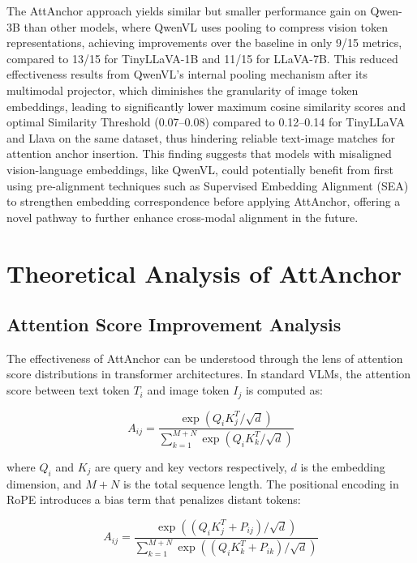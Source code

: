 \documentclass[11pt]{article}
\begin{document}
The AttAnchor approach yields similar but smaller performance gain on Qwen-3B than other models, where QwenVL uses pooling to compress vision token representations, achieving improvements over the baseline in only 9/15 metrics, compared to 13/15 for TinyLLaVA-1B and 11/15 for LLaVA-7B. This reduced effectiveness results from QwenVL's internal pooling mechanism after its multimodal projector, which diminishes the granularity of image token embeddings, leading to significantly lower maximum cosine similarity scores and optimal Similarity Threshold (0.07--0.08) compared to 0.12--0.14 for TinyLLaVA and Llava on the same dataset, thus hindering reliable text-image matches for attention anchor insertion. This finding suggests that models with misaligned vision-language embeddings, like QwenVL, could potentially benefit  from first using pre-alignment techniques such as Supervised Embedding Alignment (SEA)~\cite{yin2024sea} to strengthen embedding correspondence before applying AttAnchor, offering a novel pathway to further enhance cross-modal alignment in the future.


\section{Theoretical Analysis of AttAnchor}
\label{app:theoretical_analysis}

\subsection{Attention Score Improvement Analysis}

The effectiveness of AttAnchor can be understood through the lens of attention score distributions in transformer architectures. In standard VLMs, the attention score between text token $T_i$ and image token $I_j$ is computed as:

\begin{equation}
A_{ij} = \frac{\exp(Q_i K_j^T / \sqrt{d})}{\sum_{k=1}^{M+N} \exp(Q_i K_k^T / \sqrt{d})}
\end{equation}

where $Q_i$ and $K_j$ are query and key vectors respectively, $d$ is the embedding dimension, and $M + N$ is the total sequence length. The positional encoding in RoPE introduces a bias term that penalizes distant tokens:

\begin{equation}
A_{ij} = \frac{\exp((Q_i K_j^T + P_{ij}) / \sqrt{d})}{\sum_{k=1}^{M+N} \exp((Q_i K_k^T + P_{ik}) / \sqrt{d})}
\end{equation}
\end{document}
